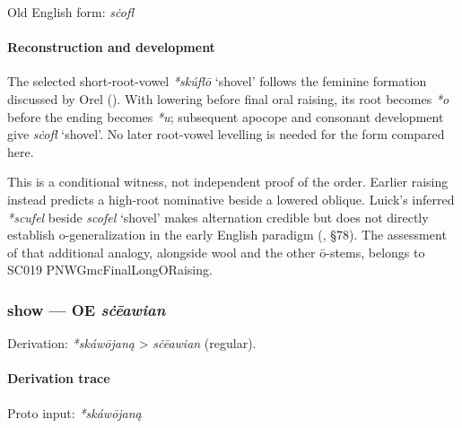 \documentclass[
  british,
  a4paper,
]{article}
\providecommand{\Recon}[1]{\emph{*#1}}
\begin{document}
Old English form: \emph{sċofl}

\paragraph{Reconstruction and
development}\label{reconstruction-and-development-3}

The selected short-root-vowel \Recon{skúflō} `shovel' follows the
feminine formation discussed by Orel (). With lowering before final oral raising, its root becomes
\emph{*o} before the ending becomes \emph{*u}; subsequent apocope and
consonant development give \emph{sċofl} `shovel'. No later root-vowel
levelling is needed for the form compared here.

This is a conditional witness, not independent proof of the order.
Earlier raising instead predicts a high-root nominative beside a lowered
oblique. Luick's inferred \emph{*scufel} beside \emph{scofel} `shovel'
makes alternation credible but does not directly establish
o-generalization in the early English paradigm
(, §78). The
assessment of that additional analogy, alongside wool and the other
ō-stems, belongs to SC019 PNWGmcFinalLongORaising.

\subsubsection{\texorpdfstring{show --- OE
\emph{sċēawian}}{show --- OE sċēawian}}\label{show-oe-sux10bux113awian}

Derivation: \emph{*skáwōjaną} \textgreater{} \emph{sċēawian} (regular).

\paragraph{Derivation trace}\label{derivation-trace-69}

Proto input: \emph{*skáwōjaną}

\begingroup
\setlength{\fboxsep}{6pt}
\end{document}
